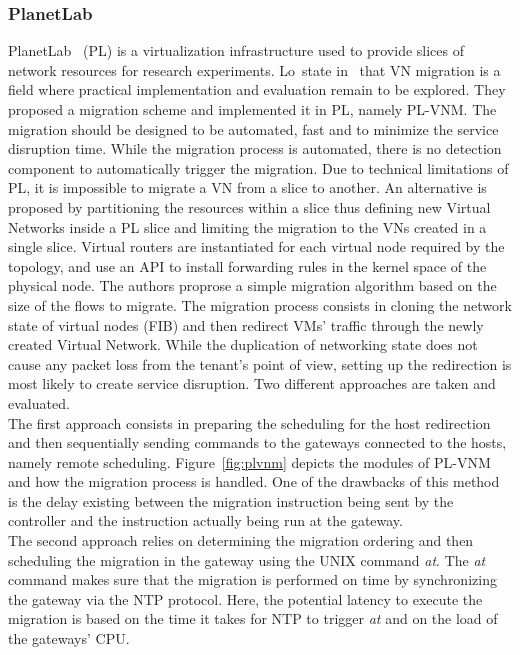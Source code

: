 \subsubsection{PlanetLab}
PlanetLab~\cite{Chun2003d} (PL) is a virtualization infrastructure used to provide slices of network resources for research experiments. Lo~\etal state in~\cite{Lo2014} that VN migration is a field where practical implementation and evaluation remain to be explored. They proposed a migration scheme and implemented it in PL, namely PL-VNM. The migration should be designed to be automated, fast and to minimize the service disruption time. While the migration process is automated, there is no detection component to automatically trigger the migration. Due to technical limitations of PL, it is impossible to migrate a VN from a slice to another. An alternative is proposed by partitioning the resources within a slice thus defining new Virtual Networks inside a PL slice and limiting the migration to the VNs created in a single slice. Virtual routers are instantiated for each virtual node required by the topology, and use an API to install forwarding rules in the kernel space of the physical node.
The authors proprose a simple migration algorithm based on the size of the flows to migrate.
The migration process consists in cloning the network state of virtual nodes (\ie FIB) and then  redirect VMs' traffic through the newly created Virtual Network.
While the duplication of networking state does not cause any packet loss from the tenant's point of view, setting up the redirection is most likely to create service disruption.
Two different approaches are taken and evaluated.\\
The first approach consists in preparing the scheduling for the host redirection and then sequentially sending commands to the gateways connected to the hosts, namely remote scheduling.
Figure~\ref{fig:plvnm} depicts the modules of PL-VNM and how the migration process is handled.
One of the drawbacks of this method is the delay existing between the migration instruction being sent by the controller and the instruction actually being run at the gateway.\\
The second approach relies on determining the migration ordering and then scheduling the migration in the gateway using the UNIX command \textit{at}. The \textit{at} command makes sure that the migration is performed on time by synchronizing the gateway via the NTP protocol. Here, the potential latency to execute the migration is based on the time it takes for NTP to trigger \textit{at} and on the load of the gateways' CPU.
